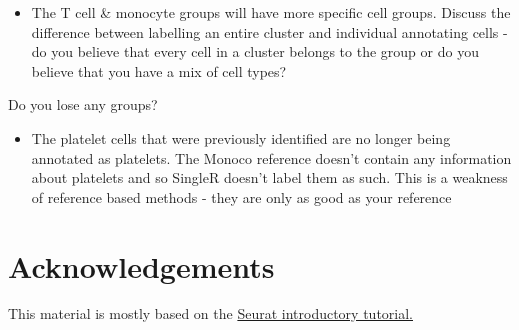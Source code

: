 \documentclass[
]{book}
\newenvironment{Shaded}{\begin{snugshade}}{\end{snugshade}}
\newcommand{\AttributeTok}[1]{\textcolor[rgb]{0.13,0.29,0.53}{#1}}
\newcommand{\FunctionTok}[1]{\textcolor[rgb]{0.13,0.29,0.53}{\textbf{#1}}}
\newcommand{\NormalTok}[1]{#1}
\newcommand{\OtherTok}[1]{\textcolor[rgb]{0.56,0.35,0.01}{#1}}
\newcommand{\SpecialCharTok}[1]{\textcolor[rgb]{0.81,0.36,0.00}{\textbf{#1}}}
\newcommand{\StringTok}[1]{\textcolor[rgb]{0.31,0.60,0.02}{#1}}
\providecommand{\tightlist}{%
  \setlength{\itemsep}{0pt}\setlength{\parskip}{0pt}}
\begin{document}
\begin{Shaded}
\end{Shaded}

\begin{itemize}
\tightlist
\item
  The T cell \& monocyte groups will have more specific cell groups. Discuss the difference between labelling an entire cluster and individual annotating cells - do you believe that every cell in a cluster belongs to the group or do you believe that you have a mix of cell types?
\end{itemize}

Do you lose any groups?

\begin{itemize}
\tightlist
\item
  The platelet cells that were previously identified are no longer being annotated as platelets. The Monoco reference doesn't contain any information about platelets and so SingleR doesn't label them as such. This is a weakness of reference based methods - they are only as good as your reference
\end{itemize}

\hypertarget{acknowledgements}{%
\chapter{Acknowledgements}\label{acknowledgements}}

This material is mostly based on the \href{https://satijalab.org/seurat/articles/pbmc3k_tutorial.html}{Seurat introductory tutorial.}
\end{document}
